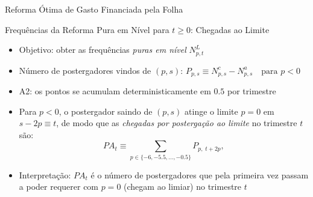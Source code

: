 \begin{frame}{Reforma Ótima de Gasto Financiada pela Folha}
\centering
{}
\end{frame}

\begin{frame}[label=pureL]{Frequências da Reforma Pura em Nível para $t\geq 0$: Chegadas ao Limite}
\begin{itemize}
    \item Objetivo: obter as frequências \emph{puras em nível} $N^{L}_{p,t}$
    \item Número de postergadores vindos de $(p,s)$: $P_{p,s}\equiv N^{c}_{p,s}-N^{a}_{p,s}\quad\text{para }p<0$
    \item A2: os pontos se acumulam deterministicamente em $0.5$ por trimestre
    \item Para $p<0$, o postergador saindo de $(p,s)$ atinge o limite $p=0$ em $s-2p\equiv t$, de modo que as \emph{chegadas por postergação ao limite} no trimestre $t$ são:
    \[
        PA_{t} \equiv \sum_{p\in\{-6,-5.5,\dots,-0.5\}} P_{p,\;t+2p},
    \]
    \item Interpretação: $PA_{t}$ é o número de postergadores que pela primeira vez passam a poder requerer com $p=0$ (chegam ao limiar) no trimestre $t$
\end{itemize}
\end{frame}

